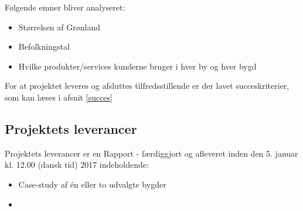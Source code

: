 Følgende emner bliver analyseret:
\begin{itemize}
	\item Størrelsen af Grønland
	\item Befolkningstal
	\item Hvilke produkter/services kunderne bruger i hver by og hver bygd
\end{itemize}

For at projektet leveres og afsluttes tilfredsstillende er der lavet succeskriterier, som kan læses i afsnit \ref{succes} 

%
%



\subsection{Projektets leverancer}
Projektets leverancer er en Rapport - færdiggjort og afleveret inden den 5. januar kl. 12.00 (dansk tid) 2017 indeholdende:
\begin{itemize}
	\item Case-study af én eller to udvalgte bygder
	\item 
\end{itemize}                                                                                                         

